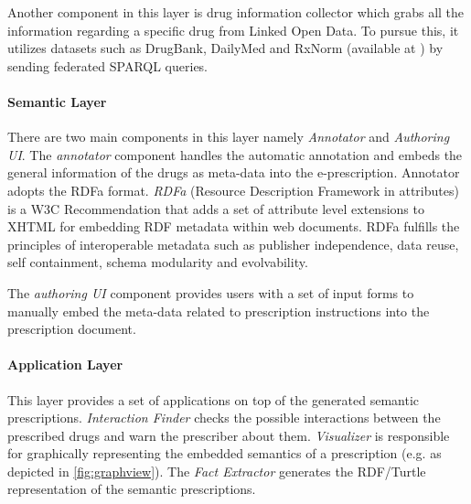 \documentclass[journal]{IEEEtran}
\begin{document}
Another component in this layer is drug information collector which grabs all the information regarding a specific drug from Linked Open Data.
To pursue this, it utilizes datasets such as DrugBank, DailyMed and RxNorm (available at \cite{lodd}) by sending federated SPARQL queries.

\paragraph{Semantic Layer}
There are two main components in this layer namely \emph{Annotator} and \emph{Authoring UI}.
The \emph{annotator} component handles the automatic annotation and embeds the general information of the drugs as meta-data into the e-prescription.
Annotator adopts the RDFa format. \emph{RDFa} (Resource Description Framework in attributes) is a W3C Recommendation that adds a set of attribute level extensions to XHTML for embedding RDF metadata within web documents.
RDFa fulfills the principles of interoperable metadata such as publisher independence, data reuse, self containment, schema modularity and evolvability.

The \emph{authoring UI} component provides users with a set of input forms to manually embed the meta-data related to prescription instructions into the prescription document.

\paragraph{Application Layer}
This layer provides a set of applications on top of the generated semantic prescriptions.
\emph{Interaction Finder} checks the possible interactions between the prescribed drugs and warn the prescriber about them.
\emph{Visualizer} is responsible for graphically representing the embedded semantics of a prescription (e.g. as depicted in \autoref{fig:graphview}).
The \emph{Fact Extractor} generates the RDF/Turtle representation of the semantic prescriptions.
\end{document}
